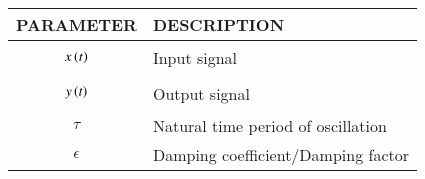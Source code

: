\begin{tabular}{|p{3cm}|p{5cm}|}
    \hline
    PARAMETER & DESCRIPTION   \\ \hline
    $$x\left(t\right)$$ & Input signal  \\ \hline
    $$y\left(t\right)$$ & Output signal \\ \hline
    $$\tau$$ & Natural time period of oscillation  \\ \hline
    $$\epsilon$$ & Damping coefficient/Damping factor  \\ \hline
\end{tabular}
